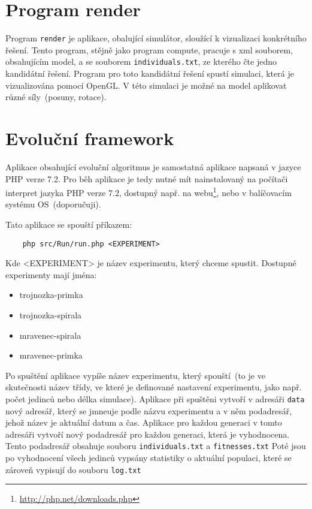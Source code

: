 \section{Program render}
Program \texttt{render} je aplikace, obalující simulátor, sloužící k vizualizaci konkrétního řešení.
Tento program, stějně jako program compute, pracuje s xml souborem, obsahujícím model, a se souborem \texttt{individuals.txt}, ze kterého čte jedno kandidátní řešení.
Program pro toto kandidátní řešení spustí simulaci, která je vizualizována pomocí OpenGL\@.
V této simulaci je možné na model aplikovat různé síly~(posuny, rotace).


\section{Evoluční framework}
Aplikace obsahující evoluční algoritmus je samostatná aplikace napsaná v jazyce PHP verze 7.2.
Pro běh aplikace je tedy nutné mít nainstalovaný na počítači interpret jazyka PHP verze 7.2, dostupný např. na webu\footnote{\url{http://php.net/downloads.php}}, nebo v balíčovacím systému OS~(doporučuji).

Tato aplikace se spouští příkazem:
\begin{verbatim}
    php src/Run/run.php <EXPERIMENT>
\end{verbatim}

Kde <EXPERIMENT> je název experimentu, který chceme spustit.
Dostupné experimenty mají jména:
\begin{itemize}
    \item trojnozka-primka
    \item trojnozka-spirala
    \item mravenec-spirala
    \item mravenec-primka
\end{itemize}

Po spuštění aplikace vypíše název experimentu, který spouští~(to je ve skutečnosti název třídy, ve které je definované nastavení experimentu, jako např. počet jedinců nebo délka simulace).
Aplikace při spuštěni vytvoří v adresáři \texttt{data} nový adresář, který se jmneuje podle názvu experimentu a v něm podadresář, jehož název je aktuální datum a čas.
Aplikace pro každou generaci v tomto adresáři vytvoří nový podadresář pro každou generaci, která je vyhodnocena.
Tento podadresář obsahuje souboru \texttt{individuals.txt} a \texttt{fitnesses.txt}
Poté jsou po vyhodnocení všech jedinců vypsány statistiky o aktuální populaci, které se zároveň vypisují do souboru \texttt{log.txt}






